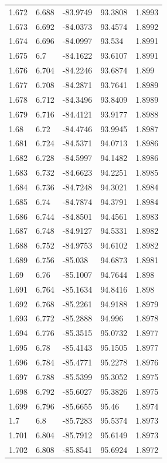 \begin{tabular}{lllll}
1.672 & 6.688 & -83.9749 & 93.3808 & 1.8993 \\
1.673 & 6.692 & -84.0373 & 93.4574 & 1.8992 \\
1.674 & 6.696 & -84.0997 & 93.534 & 1.8991 \\
1.675 & 6.7 & -84.1622 & 93.6107 & 1.8991 \\
1.676 & 6.704 & -84.2246 & 93.6874 & 1.899 \\
1.677 & 6.708 & -84.2871 & 93.7641 & 1.8989 \\
1.678 & 6.712 & -84.3496 & 93.8409 & 1.8989 \\
1.679 & 6.716 & -84.4121 & 93.9177 & 1.8988 \\
1.68 & 6.72 & -84.4746 & 93.9945 & 1.8987 \\
1.681 & 6.724 & -84.5371 & 94.0713 & 1.8986 \\
1.682 & 6.728 & -84.5997 & 94.1482 & 1.8986 \\
1.683 & 6.732 & -84.6623 & 94.2251 & 1.8985 \\
1.684 & 6.736 & -84.7248 & 94.3021 & 1.8984 \\
1.685 & 6.74 & -84.7874 & 94.3791 & 1.8984 \\
1.686 & 6.744 & -84.8501 & 94.4561 & 1.8983 \\
1.687 & 6.748 & -84.9127 & 94.5331 & 1.8982 \\
1.688 & 6.752 & -84.9753 & 94.6102 & 1.8982 \\
1.689 & 6.756 & -85.038 & 94.6873 & 1.8981 \\
1.69 & 6.76 & -85.1007 & 94.7644 & 1.898 \\
1.691 & 6.764 & -85.1634 & 94.8416 & 1.898 \\
1.692 & 6.768 & -85.2261 & 94.9188 & 1.8979 \\
1.693 & 6.772 & -85.2888 & 94.996 & 1.8978 \\
1.694 & 6.776 & -85.3515 & 95.0732 & 1.8977 \\
1.695 & 6.78 & -85.4143 & 95.1505 & 1.8977 \\
1.696 & 6.784 & -85.4771 & 95.2278 & 1.8976 \\
1.697 & 6.788 & -85.5399 & 95.3052 & 1.8975 \\
1.698 & 6.792 & -85.6027 & 95.3826 & 1.8975 \\
1.699 & 6.796 & -85.6655 & 95.46 & 1.8974 \\
1.7 & 6.8 & -85.7283 & 95.5374 & 1.8973 \\
1.701 & 6.804 & -85.7912 & 95.6149 & 1.8973 \\
1.702 & 6.808 & -85.8541 & 95.6924 & 1.8972 \\

\end{tabular}
